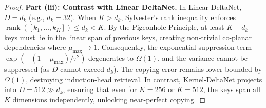 \begin{proof}
\bigskip
\noindent
\textbf{Part (iii): Contrast with Linear DeltaNet.}
In Linear DeltaNet, $D = d_k$ (e.g., $d_k = 32$). When $K > d_k$, Sylvester's rank inequality enforces $\operatorname{rank}([k_1, \dots, k_K]) \le d_k < K$. By the Pigeonhole Principle, at least $K - d_k$ keys must lie in the linear span of previous keys, creating non-trivial co-planar dependencies where $\mu_{\max} \to 1$. Consequently, the exponential suppression term $\exp(-(1 - \mu_{\max})/\tau^2)$ degenerates to $\Omega(1)$, and the variance cannot be suppressed (as $D$ cannot exceed $d_k$). The copying error remains lower-bounded by $\Omega(1)$, destroying induction-head retrieval. In contrast, Kernel-DeltaNet projects into $D = 512 \gg d_k$, ensuring that even for $K = 256$ or $K = 512$, the keys span all $K$ dimensions independently, unlocking near-perfect copying.
\end{proof}
